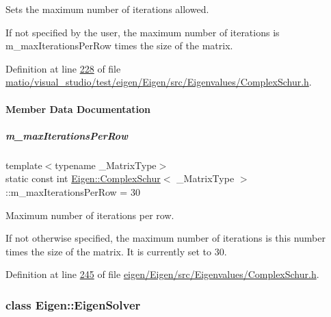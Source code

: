 Sets the maximum number of iterations allowed. 

If not specified by the user, the maximum number of iterations is m\+\_\+max\+Iterations\+Per\+Row times the size of the matrix. 

Definition at line \hyperlink{matio_2visual__studio_2test_2eigen_2_eigen_2src_2_eigenvalues_2_complex_schur_8h_source_l00228}{228} of file \hyperlink{matio_2visual__studio_2test_2eigen_2_eigen_2src_2_eigenvalues_2_complex_schur_8h_source}{matio/visual\+\_\+studio/test/eigen/\+Eigen/src/\+Eigenvalues/\+Complex\+Schur.\+h}.



\paragraph{Member Data Documentation}
\mbox{\label{group___eigenvalues___module_a891e98fa0c95cb14896e8a2ffd7e4fe8}} 
\subparagraph{\texorpdfstring{m\+\_\+max\+Iterations\+Per\+Row}{m\_maxIterationsPerRow}}
{\footnotesize\ttfamily template$<$typename \+\_\+\+Matrix\+Type$>$ \\
static const int \hyperlink{group___eigenvalues___module_class_eigen_1_1_complex_schur}{Eigen\+::\+Complex\+Schur}$<$ \+\_\+\+Matrix\+Type $>$\+::m\+\_\+max\+Iterations\+Per\+Row = 30\hspace{0.3cm}{\ttfamily [static]}}



Maximum number of iterations per row. 

If not otherwise specified, the maximum number of iterations is this number times the size of the matrix. It is currently set to 30. 

Definition at line \hyperlink{eigen_2_eigen_2src_2_eigenvalues_2_complex_schur_8h_source_l00245}{245} of file \hyperlink{eigen_2_eigen_2src_2_eigenvalues_2_complex_schur_8h_source}{eigen/\+Eigen/src/\+Eigenvalues/\+Complex\+Schur.\+h}.

\label{class_eigen_1_1_eigen_solver}
\subsubsection{class Eigen\+:\+:Eigen\+Solver}
